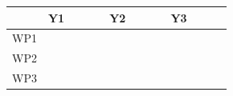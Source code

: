 \documentclass[serif, twocolumn, numeric, rga]{jote-article}
\begin{document}
\begin{table}
\sffamily
\centering
\setlength{\extrarowheight}{0pt}
\addtolength{\extrarowheight}{\aboverulesep}
\addtolength{\extrarowheight}{\belowrulesep}
\setlength{\aboverulesep}{0pt}
\setlength{\belowrulesep}{0pt}
\begin{tabular}{@{}p{27mm}>{\centering\arraybackslash}p{8mm}>{\centering\arraybackslash}p{8mm}>{\centering\arraybackslash}p{8mm}>{\centering\arraybackslash}p{8mm}>{\centering\arraybackslash}p{8mm}>{\centering\arraybackslash}p{8mm}>{\centering\arraybackslash}p{9mm}>{\centering\arraybackslash}p{8mm}>{\centering\arraybackslash}p{8mm}>{\centering\arraybackslash}p{8mm}>{\centering\arraybackslash}p{7mm}>{\centering\arraybackslash}p{7mm}} 
\toprule
 & \textbf{Y1 }                                  &                                      &                                      &                                      & \textbf{Y2 }                                  &                                      &                                      &                                      &\textbf{ Y3    }                               &                                      &                                      &                                       \\ \midrule 
WP1                                & {\cellcolor{jote}} & {\cellcolor{jote}} & {\cellcolor{jote}} & {\cellcolor{jote}} &                                      &                                      &                                      &                                      &                                      &                                      &                                      &                                       \\ 
WP2                                &                                      &                                      &                                      & {\cellcolor{jote}} & {\cellcolor{jote}} & {\cellcolor{jote}} & {\cellcolor{jote}} &                                      &                                      &                                      &                                      &                                       \\ 
WP3                                &                                      &                                      &                                      &                                      &                                      &                                      & {\cellcolor{jote}} & {\cellcolor{jote}} & {\cellcolor{jote}} & {\cellcolor{jote}} &                                      &                                       \\ 

\end{tabular}
\end{table}
\end{document}
